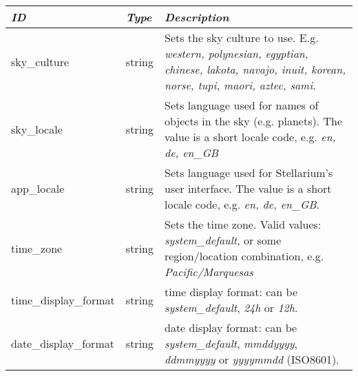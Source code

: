 \subsection{}

\begin{tabularx}{\textwidth}{l|l|X}\toprule
\emph{ID}         & \emph{Type} & \emph{Description}\\\midrule
sky\_culture          & string & Sets the sky culture to use. E.g. \emph{western, polynesian, egyptian, chinese, 
                                 lakota, navajo, inuit, korean, norse, tupi, maori, aztec, sami}.\\%
sky\_locale           & string & Sets language used for names of objects in the sky (e.g. planets). 
                                 The value is a short locale code, e.g. \emph{en, de, en\_GB}\\%
app\_locale           & string & Sets language used for Stellarium's user interface. 
                                  The value is a short locale code, e.g. \emph{en, de, en\_GB}.\\%
time\_zone            & string & Sets the time zone. Valid values: \emph{system\_default}, 
                                 or some region/location combination, e.g. \emph{Pacific/Marquesas}\\%
time\_display\_format & string & time display format: can be \emph{system\_default}, \emph{24h} or \emph{12h}.\\%
date\_display\_format & string & date display format: can be \emph{system\_default}, \emph{mmddyyyy}, \emph{ddmmyyyy} or \emph{yyyymmdd} (ISO8601).\\\bottomrule
\end{tabularx}

\subsection{}


